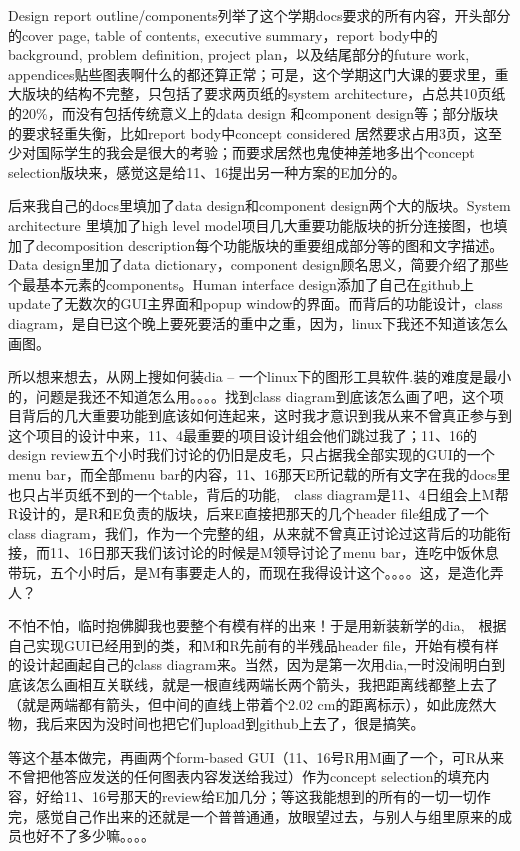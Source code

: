 \documentclass[12pt]{book}
\begin{document}
Design report outline/components列举了这个学期docs要求的所有内容，开头部分的cover page, table of contents, executive summary，report body中的background, problem definition, project plan，以及结尾部分的future work, appendices贴些图表啊什么的都还算正常；可是，这个学期这门大课的要求里，重大版块的结构不完整，只包括了要求两页纸的system architecture，占总共10页纸的20\%，而没有包括传统意义上的data design 和component design等；部分版块的要求轻重失衡，比如report body中concept considered 居然要求占用3页，这至少对国际学生的我会是很大的考验；而要求居然也鬼使神差地多出个concept selection版块来，感觉这是给11、16提出另一种方案的E加分的。

后来我自己的docs里填加了data design和component design两个大的版块。System architecture 里填加了high level model项目几大重要功能版块的折分连接图，也填加了decomposition description每个功能版块的重要组成部分等的图和文字描述。Data design里加了data dictionary，component design顾名思义，简要介绍了那些个最基本元素的components。Human interface design添加了自己在github上update了无数次的GUI主界面和popup window的界面。而背后的功能设计，class diagram，是自已这个晚上要死要活的重中之重，因为，linux下我还不知道该怎么画图。

所以想来想去，从网上搜如何装dia -- 一个linux下的图形工具软件.装的难度是最小的，问题是我还不知道怎么用。。。。找到class diagram到底该怎么画了吧，这个项目背后的几大重要功能到底该如何连起来，这时我才意识到我从来不曾真正参与到这个项目的设计中来，11、4最重要的项目设计组会他们跳过我了；11、16的design review五个小时我们讨论的仍旧是皮毛，只占据我全部实现的GUI的一个menu bar，而全部menu bar的内容，11、16那天E所记载的所有文字在我的docs里也只占半页纸不到的一个table，背后的功能,　class diagram是11、4日组会上M帮R设计的，是R和E负责的版块，后来E直接把那天的几个header file组成了一个class diagram，我们，作为一个完整的组，从来就不曾真正讨论过这背后的功能衔接，而11、16日那天我们该讨论的时候是M领导讨论了menu bar，连吃中饭休息带玩，五个小时后，是M有事要走人的，而现在我得设计这个。。。。这，是造化弄人？

不怕不怕，临时抱佛脚我也要整个有模有样的出来！于是用新装新学的dia,　根据自己实现GUI已经用到的类，和M和R先前有的半残品header file，开始有模有样的设计起画起自己的class diagram来。当然，因为是第一次用dia,一时没闹明白到底该怎么画相互关联线，就是一根直线两端长两个箭头，我把距离线都整上去了（就是两端都有箭头，但中间的直线上带着个2.02 cm的距离标示），如此庞然大物，我后来因为没时间也把它们upload到github上去了，很是搞笑。

等这个基本做完，再画两个form-based GUI（11、16号R用M画了一个，可R从来不曾把他答应发送的任何图表内容发送给我过）作为concept selection的填充内容，好给11、16号那天的review给E加几分；等这我能想到的所有的一切一切作完，感觉自己作出来的还就是一个普普通通，放眼望过去，与别人与组里原来的成员也好不了多少嘛。。。。
\end{document}
